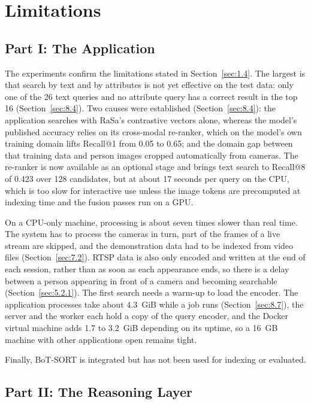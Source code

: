 \section{Limitations}
\label{sec:9.2}

\subsection{Part I: The Application}
\label{sec:12.2.1}

The experiments confirm the limitations stated in Section~\ref{sec:1.4}. The largest is that search by text and by attributes is not yet effective on the test data: only one of the 26 text queries and no attribute query has a correct result in the top 16 (Section~\ref{sec:8.4}). Two causes were established (Section~\ref{sec:8.4}): the application searches with RaSa's contrastive vectors alone, whereas the model's published accuracy relies on its cross-modal re-ranker, which on the model's own training domain lifts Recall@1 from 0.05 to 0.65; and the domain gap between that training data and person images cropped automatically from cameras. The re-ranker is now available as an optional stage and brings text search to Recall@8 of 0.423 over 128 candidates, but at about 17 seconds per query on the CPU, which is too slow for interactive use unless the image tokens are precomputed at indexing time and the fusion passes run on a GPU.

On a CPU-only machine, processing is about seven times slower than real time. The system has to process the cameras in turn, part of the frames of a live stream are skipped, and the demonstration data had to be indexed from video files (Section~\ref{sec:7.2}). RTSP data is also only encoded and written at the end of each session, rather than as soon as each appearance ends, so there is a delay between a person appearing in front of a camera and becoming searchable (Section~\ref{sec:5.2.1}). The first search needs a warm-up to load the encoder. The application processes take about 4.3~GiB while a job runs (Section~\ref{sec:8.7}), the server and the worker each hold a copy of the query encoder, and the Docker virtual machine adds 1.7 to 3.2~GiB depending on its uptime, so a 16~GB machine with other applications open remains tight.

Finally, BoT-SORT is integrated but has not been used for indexing or evaluated.

\subsection{Part II: The Reasoning Layer}
\label{sec:12.2.2}


